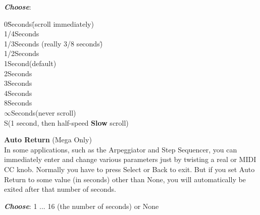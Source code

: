 \documentclass{article}
\begin{document}
\begin{description}
		
		\begin{description}
			\item{\bf \textit{Choose}}:
			\begin{tabbing}
			0\hspace{2em}\=Seconds\hspace{0.5in}\=(scroll immediately)\\
			1/4\>Seconds\\
			1/3\>Seconds \>(really 3/8 seconds)\hspace{1in}\=\\
			1/2\>Seconds\\
			1\>Second\>(default)\\
			2\>Seconds\\
			3\>Seconds\\
			4\>Seconds\\
			8\>Seconds\\
			\(\infty\)\>Seconds\>(never scroll)\>\\
			S\>\>(1 second, then half-speed {\bf Slow} scroll)
			\end{tabbing}
		\end{description}

	\item{\bf  Auto Return} (Mega Only)\\
		In some applications, such as the Arpeggiator and Step Sequencer, you can immediately enter and change various parameters just by twisting a real or MIDI CC knob.  Normally you have to press Select or Back to exit.  But if you set Auto Return to some value (in seconds) other than None, you will automatically be exited after that number of seconds.

			\begin{description}
					\item{\bf \textit{Choose}}: 1 ... 16 (the number of seconds) or None\hspace{1.45in}\smash{\texttt{[image: none.pdf]}}
			\end{description}

		

\end{description}
\end{document}
